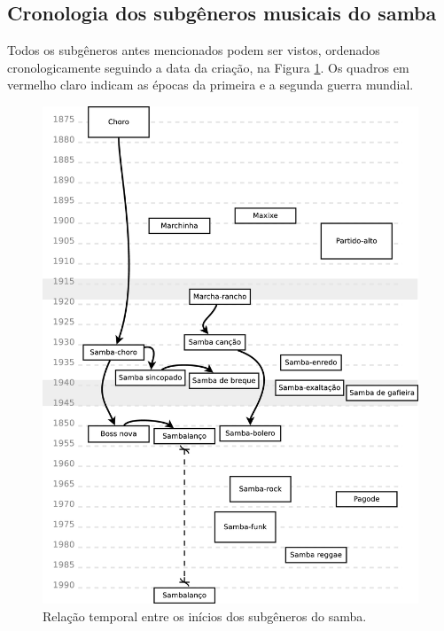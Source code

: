 \subsection{Cronologia dos subgêneros musicais do samba}
Todos os subgêneros antes mencionados podem ser vistos, ordenados cronologicamente 
seguindo a data da criação, na Figura \ref{fig:sambamusicatimeline1}. 
Os quadros  em vermelho claro indicam as épocas da primeira e a segunda guerra mundial.

\clearpage
\begin{figure}[H]
  \centering
    \includegraphics[width=1.0\textwidth]{chapters/cap-historia-musicasamba/musicatimeline.eps}
  \caption{Relação temporal entre os inícios dos subgêneros do samba.}
\label{fig:sambamusicatimeline1}
\end{figure}


